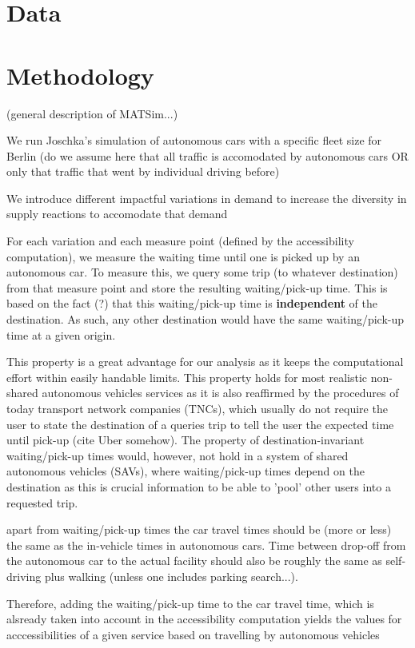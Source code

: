 \documentclass[10pt]{article}
\begin{document}
\section{Data}


\section{Methodology}
(general description of MATSim...)

We run Joschka's simulation of autonomous cars with a specific fleet size for Berlin (do we assume here that all traffic is accomodated by autonomous cars OR only that traffic that went by individual driving before)

We introduce different impactful variations in demand to increase the diversity in supply reactions to accomodate that demand

For each variation and each measure point (defined by the accessibility computation), we measure the waiting time until one is picked up by an autonomous car. To measure this, we query some trip (to whatever destination) from that measure point and store the resulting waiting/pick-up time. This is based on the fact (?) that this waiting/pick-up time is \textbf{independent} of the destination. As such, any other destination would have the same waiting/pick-up time at a given origin.

This property is a great advantage for our analysis as it keeps the computational effort within easily handable limits.
This property holds for most realistic non-shared autonomous vehicles services as it is also reaffirmed by the procedures of today transport network companies (TNCs), which usually do not require the user to state the destination of a queries trip to tell the user the expected time until pick-up (cite Uber somehow). The property of destination-invariant waiting/pick-up times would, however, not hold in a system of shared autonomous vehicles (SAVs), where waiting/pick-up times depend on the destination as this is crucial information to be able to 'pool' other users into a requested trip.

apart from waiting/pick-up times the car travel times should be (more or less) the same as the in-vehicle times in autonomous cars. Time between drop-off from the autonomous car to the actual facility should also be roughly the same as self-driving plus walking (unless one includes parking search...).

Therefore, adding the waiting/pick-up time to the car travel time, which is alsready taken into account in the accessibility computation yields the values for acccessibilities of a given service based on travelling by autonomous vehicles
\end{document}
